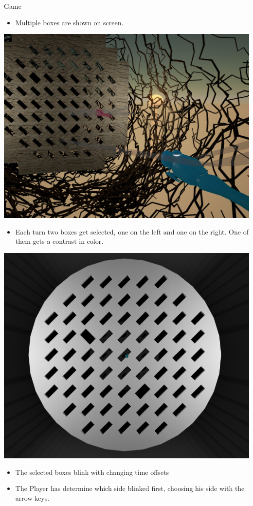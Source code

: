 \documentclass[a0paper,portrait]{baposter}
\begin{document}
\begin{poster}
		\begin{posterbox}[name=game,span=1,column=1,row=1,below=intro]{Game}
			\begin{itemize}
				\item Multiple boxes are shown on screen.
			\end{itemize}
			\includegraphics[width=1\textwidth]{game.jpg}
			\begin{itemize}
				\item Each turn two boxes get selected, one on the left and one on the right. One of them gets a contrast in color.
			\end{itemize}
			\includegraphics[width=1 \textwidth]{grate.jpg}
			\begin{itemize}
				\item The selected boxes blink with changing time offsets
			\end{itemize}
			\begin{itemize}
				\item The Player has determine which side blinked first, choosing his side with the arrow keys.
			\end{itemize}
		\end{posterbox}
		

\end{poster}
\end{document}
